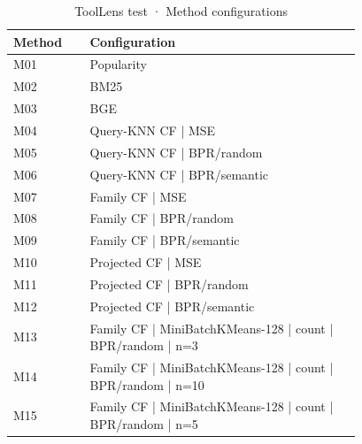 \begin{table}
\caption{ToolLens test · Method configurations}
\label{tab:ToolLens-test-comparison-comparison-methods}
\begin{tabular}{lp{0.78\linewidth}}
\toprule
Method & Configuration \\
\midrule
M01 & Popularity \\
M02 & BM25 \\
M03 & BGE \\
M04 & Query-KNN CF | MSE \\
M05 & Query-KNN CF | BPR/random \\
M06 & Query-KNN CF | BPR/semantic \\
M07 & Family CF | MSE \\
M08 & Family CF | BPR/random \\
M09 & Family CF | BPR/semantic \\
M10 & Projected CF | MSE \\
M11 & Projected CF | BPR/random \\
M12 & Projected CF | BPR/semantic \\
M13 & Family CF | MiniBatchKMeans-128 | count | BPR/random | n=3 \\
M14 & Family CF | MiniBatchKMeans-128 | count | BPR/random | n=10 \\
M15 & Family CF | MiniBatchKMeans-128 | count | BPR/random | n=5 \\
\bottomrule
\end{tabular}
\end{table}
